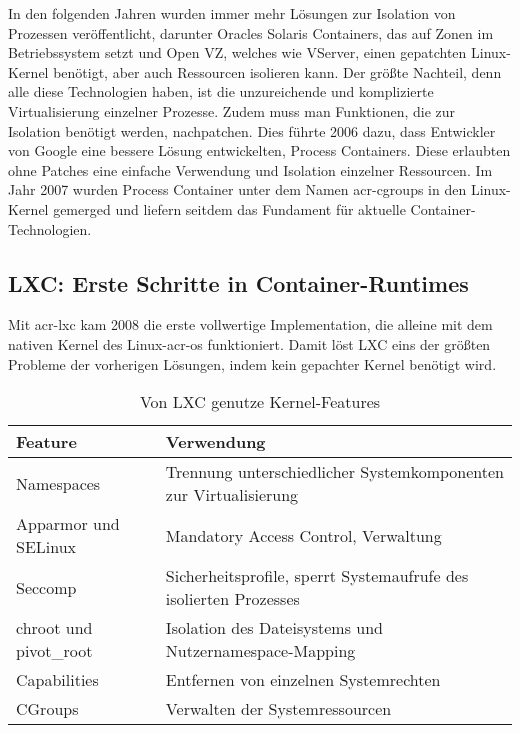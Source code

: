 In den folgenden Jahren wurden immer mehr Lösungen zur Isolation von Prozessen veröffentlicht, darunter Oracles Solaris Containers, das auf Zonen im Betriebssystem setzt und Open VZ, welches wie VServer, einen gepatchten Linux-Kernel benötigt, aber auch Ressourcen isolieren kann. Der größte Nachteil, denn alle diese Technologien haben, ist die unzureichende und komplizierte Virtualisierung einzelner Prozesse. Zudem muss man Funktionen, die zur Isolation benötigt werden, nachpatchen. Dies führte 2006 dazu, dass Entwickler von Google eine bessere Lösung entwickelten, Process Containers. Diese erlaubten ohne Patches eine einfache Verwendung und Isolation einzelner Ressourcen. Im Jahr 2007 wurden Process Container unter dem Namen \glspl{acr-cgroup} in den Linux-Kernel gemerged und liefern seitdem das Fundament für aktuelle Container-Technologien.

\subsection{LXC: Erste Schritte in Container-Runtimes}
\label{sec:geschichteLXC}
Mit \gls{acr-lxc} kam 2008 die erste vollwertige Implementation, die alleine mit dem nativen Kernel des Linux-\gls{acr-os} funktioniert. Damit löst LXC eins der größten Probleme der vorherigen Lösungen, indem kein gepachter Kernel benötigt wird.
\begin{table}[h]
		\begin{tabular}{ll}
			\toprule
			Feature & Verwendung\\
			\midrule
			Namespaces & Trennung unterschiedlicher Systemkomponenten zur Virtualisierung\\
			Apparmor und SELinux & Mandatory Access Control, Verwaltung\\
			Seccomp & Sicherheitsprofile, sperrt Systemaufrufe des isolierten Prozesses\\
			chroot und pivot\_root & Isolation des Dateisystems und Nutzernamespace-Mapping\\
			Capabilities & Entfernen von einzelnen Systemrechten\\
			CGroups & Verwalten der Systemressourcen\\
			\bottomrule
		\end{tabular}
	\caption{Von LXC genutze Kernel-Features}
	\label{tab:lxcKernel}
\end{table}

